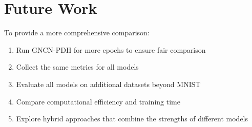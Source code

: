 \documentclass[11pt,a4paper]{article}
\begin{document}
\section{Future Work}

To provide a more comprehensive comparison:
\begin{enumerate}
    \item Run GNCN-PDH for more epochs to ensure fair comparison
    \item Collect the same metrics for all models
    \item Evaluate all models on additional datasets beyond MNIST
    \item Compare computational efficiency and training time
    \item Explore hybrid approaches that combine the strengths of different models
\end{enumerate}
\end{document}
